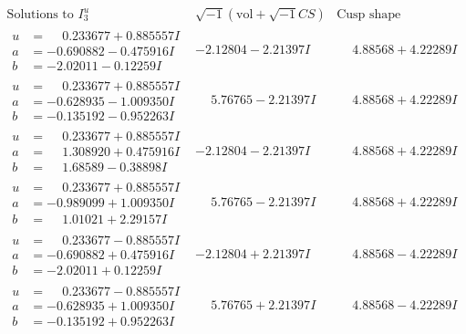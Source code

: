 \documentclass[1p]{elsarticle_modified}
\theoremstyle{definition}
\newcommand{\I}{\sqrt{-1}}
\begin{document}
$$\begin{array}{c|c|c}  
\text{Solutions to }I^u_{3}& \I (\text{vol} + \sqrt{-1}CS) & \text{Cusp shape}\\
 \hline 
\begin{aligned}
u &= \phantom{-}0.233677 + 0.885557 I \\
a &= -0.690882 - 0.475916 I \\
b &= -2.02011 - 0.12259 I\end{aligned}
 & -2.12804 - 2.21397 I & \phantom{-}4.88568 + 4.22289 I \\ \hline\begin{aligned}
u &= \phantom{-}0.233677 + 0.885557 I \\
a &= -0.628935 - 1.009350 I \\
b &= -0.135192 - 0.952263 I\end{aligned}
 & \phantom{-}5.76765 - 2.21397 I & \phantom{-}4.88568 + 4.22289 I \\ \hline\begin{aligned}
u &= \phantom{-}0.233677 + 0.885557 I \\
a &= \phantom{-}1.308920 + 0.475916 I \\
b &= \phantom{-}1.68589 - 0.38898 I\end{aligned}
 & -2.12804 - 2.21397 I & \phantom{-}4.88568 + 4.22289 I \\ \hline\begin{aligned}
u &= \phantom{-}0.233677 + 0.885557 I \\
a &= -0.989099 + 1.009350 I \\
b &= \phantom{-}1.01021 + 2.29157 I\end{aligned}
 & \phantom{-}5.76765 - 2.21397 I & \phantom{-}4.88568 + 4.22289 I \\ \hline\begin{aligned}
u &= \phantom{-}0.233677 - 0.885557 I \\
a &= -0.690882 + 0.475916 I \\
b &= -2.02011 + 0.12259 I\end{aligned}
 & -2.12804 + 2.21397 I & \phantom{-}4.88568 - 4.22289 I \\ \hline\begin{aligned}
u &= \phantom{-}0.233677 - 0.885557 I \\
a &= -0.628935 + 1.009350 I \\
b &= -0.135192 + 0.952263 I\end{aligned}
 & \phantom{-}5.76765 + 2.21397 I & \phantom{-}4.88568 - 4.22289 I \\ \hline\begin{aligned}

\end{aligned}
\end{array}$$
\end{document}
